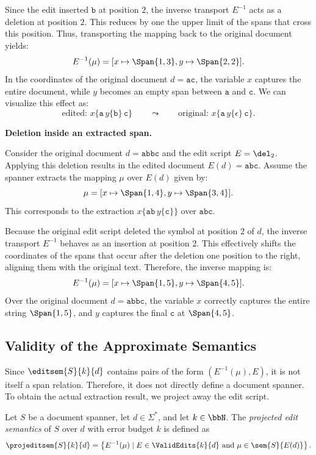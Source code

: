 Since the edit inserted $\mathtt{b}$ at position $2$, the inverse transport $E^{-1}$ acts as a deletion at position $2$. This reduces by one the upper limit of the spans that cross this position. 
Thus, transporting the mapping back to the original document yields:
\[
E^{-1}(\mu)
=
[
x \mapsto \Span{1,3},
y \mapsto \Span{2,2}
].
\]
In the coordinates of the original document $d=\mathtt{ac}$, the variable $x$ captures the entire document, while $y$ becomes an empty span between $\mathtt{a}$ and $\mathtt{c}$. We can visualize this effect as:
\[
\text{edited: } x\{\mathtt{a}\,y\{\mathtt{b}\}\,\mathtt{c}\}
\qquad
\leadsto
\qquad
\text{original: } x\{\mathtt{a}\,y\{\epsilon\}\,\mathtt{c}\}.
\]


\noindent
\textbf{Deletion inside an extracted span.}

Consider the original document $d=\mathtt{abbc}$ and the edit script $E=\del_2$.
Applying this deletion results in the edited document $E(d)=\mathtt{abc}$.
Assume the spanner extracts the mapping $\mu$ over $E(d)$ given by:
\[
\mu =
[
x \mapsto \Span{1,4},
y \mapsto \Span{3,4}
].
\]
This corresponds to the extraction $x\{\mathtt{a}\mathtt{b}\,y\{\mathtt{c}\}\}$ over $\mathtt{abc}$.

Because the original edit script deleted the symbol at position $2$ of $d$, the inverse transport $E^{-1}$ behaves as an insertion at position $2$. This effectively shifts the coordinates of the spans that occur after the deletion one position to the right, aligning them with the original text. 
Therefore, the inverse mapping is:
\[
E^{-1}(\mu)
=
[
x \mapsto \Span{1,5},
y \mapsto \Span{4,5}
].
\]
Over the original document $d=\mathtt{abbc}$, the variable $x$ correctly captures the entire string $\Span{1,5}$, and $y$ captures the final $\mathtt{c}$ at $\Span{4,5}$.


\subsection{Validity of the Approximate Semantics}

Since $\editsem{S}{k}{d}$ contains pairs of the form $(E^{-1}(\mu),E)$, it is not itself a span relation. Therefore, it does not directly define a document spanner. To obtain the actual extraction result, we project away the edit script.

\begin{definition}
	Let $S$ be a document spanner, let $d\in\Sigma^*$, and let $k\in\bbN$.
	The \emph{projected edit semantics} of $S$ over $d$ with error budget $k$ is defined as
	\[
	\projeditsem{S}{k}{d} =
	\left\{
		E^{-1}(\mu)
		\mid
		E\in\ValidEdits{k}{d}
		\text{ and }
		\mu\in\sem{S}{E(d)}
		\right\}.
	\]
\end{definition}

